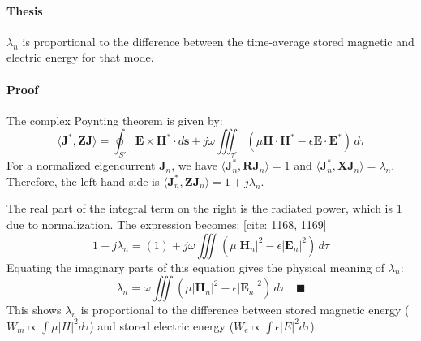 \documentclass{article}
\begin{document}
\paragraph{Thesis} $\lambda_n$ is proportional to the difference between the time-average stored magnetic and electric energy for that mode. 
\paragraph{Proof}
The complex Poynting theorem is given by: 
\begin{equation}
    \langle \mathbf{J}^*, \mathbf{Z}\mathbf{J} \rangle = \oint_{S'} \mathbf{E} \times \mathbf{H}^* \cdot d\mathbf{s} + j\omega \iiint_{\tau'} (\mu \mathbf{H}\cdot\mathbf{H}^* - \epsilon \mathbf{E}\cdot\mathbf{E}^*) \,d\tau
\end{equation}
For a normalized eigencurrent $\mathbf{J}_n$, we have $\langle \mathbf{J}_n^*, \mathbf{R}\mathbf{J}_n \rangle = 1$ and $\langle \mathbf{J}_n^*, \mathbf{X}\mathbf{J}_n \rangle = \lambda_n$. Therefore, the left-hand side is $\langle \mathbf{J}_n^*, \mathbf{Z}\mathbf{J}_n \rangle = 1 + j\lambda_n$. 

The real part of the integral term on the right is the radiated power, which is 1 due to normalization. The expression becomes: [cite: 1168, 1169]
\begin{equation}
    1 + j\lambda_n = (1) + j\omega \iiint (\mu |\mathbf{H}_n|^2 - \epsilon |\mathbf{E}_n|^2) \,d\tau
\end{equation}
Equating the imaginary parts of this equation gives the physical meaning of $\lambda_n$:
\begin{equation}
    \lambda_n = \omega \iiint (\mu |\mathbf{H}_n|^2 - \epsilon |\mathbf{E}_n|^2) \,d\tau \quad \blacksquare
\end{equation}
This shows $\lambda_n$ is proportional to the difference between stored magnetic energy ($W_m \propto \int \mu|H|^2 d\tau$) and stored electric energy ($W_e \propto \int \epsilon|E|^2 d\tau$). 
\end{document}
